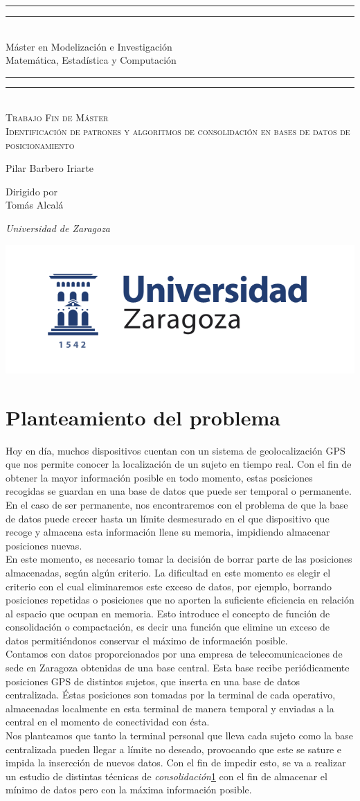 \documentclass[a4paper, 12pt]{article}
\newcommand*{\plogo}{\includegraphics[scale=.3]{unizar.png}}
\newcommand*{\titleGP}{\begingroup %
\centering %
\vspace*{\baselineskip} %

\rule{\textwidth}{1.6pt}\vspace*{-\baselineskip}\vspace*{2pt} %
\rule{\textwidth}{0.4pt}\\[\baselineskip] %

{\LARGE M\'aster en Modelizaci\'on e Investigaci\'on  \\[0.3\baselineskip] Matem\'atica, Estad\'istica y Computaci\'on}\\[0.2\baselineskip] %

\rule{\textwidth}{0.4pt}\vspace*{-\baselineskip}\vspace{3.2pt} %
\rule{\textwidth}{1.6pt}\\[\baselineskip] %

\scshape %
Trabajo Fin de M\'aster \\ %
Identificaci\'on de patrones y algoritmos de consolidaci\'on en bases de datos de posicionamiento\\[\baselineskip] %
{\Large Pilar Barbero Iriarte\par} 

\vspace*{2\baselineskip} %

Dirigido por \\[\baselineskip]
Tom\'as Alcal\'a \par %
{\itshape Universidad de Zaragoza\par} %

\vfill %

\plogo \\[0.3\baselineskip] %

\endgroup}
\begin{document}
\pagestyle{empty} %

\titleGP %

\mbox{}
\thispagestyle{empty}
\newpage

\tableofcontents


\pagebreak


\section{Planteamiento del problema}

Hoy en d\'ia, muchos dispositivos cuentan con un sistema de geolocalizaci\'on GPS que nos permite conocer la localizaci\'on de un sujeto en tiempo real. Con el fin de obtener la mayor informaci\'on posible en todo momento, estas posiciones recogidas se guardan en una base de datos que puede ser temporal o permanente. En el caso de ser permanente, nos encontraremos con el problema de que la base de datos puede crecer hasta un l\'imite desmesurado en el que dispositivo que recoge y almacena esta informaci\'on llene su memoria, impidiendo almacenar posiciones nuevas. \\

En este momento, es necesario tomar la decisi\'on de borrar parte de las posiciones almacenadas, seg\'un alg\'un criterio. La dificultad en este momento es elegir el criterio con el cual eliminaremos este exceso de datos, por ejemplo, borrando posiciones repetidas o posiciones que no aporten la suficiente eficiencia en relaci\'on al espacio que ocupan en memoria. Esto introduce el concepto de funci\'on de consolidaci\'on o compactaci\'on, es decir una funci\'on que elimine un exceso de datos permiti\'endonos conservar el m\'aximo de informaci\'on posible. \\

Contamos con datos proporcionados por una empresa de telecomunicaciones de sede en Zaragoza obtenidas de una base central. Esta base recibe peri\'odicamente posiciones GPS de distintos sujetos, que inserta en una base de datos centralizada. \'Estas posiciones son tomadas por la terminal de cada operativo, almacenadas localmente en esta terminal de manera temporal y enviadas a la central en el momento de conectividad con \'esta. \\

Nos planteamos que tanto la terminal personal que lleva cada sujeto como la base centralizada pueden llegar a l\'imite no deseado, provocando que este se sature e impida la insercci\'on de nuevos datos. Con el fin de impedir esto, se va a realizar un estudio de distintas t\'ecnicas de \textit{consolidaci\'on}\ref{} con el fin de almacenar el m\'inimo de datos pero con la m\'axima informaci\'on posible. \\
\end{document}
